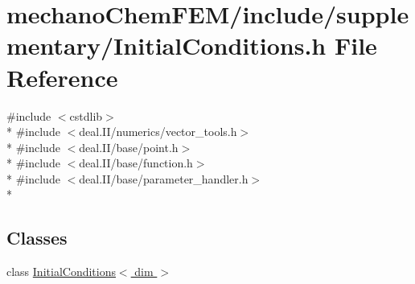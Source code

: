 \section{mechano\-Chem\-F\-E\-M/include/supplementary/\-Initial\-Conditions.h File Reference}
\label{_initial_conditions_8h}
{\ttfamily \#include $<$cstdlib$>$}\\*
{\ttfamily \#include $<$deal.\-I\-I/numerics/vector\-\_\-tools.\-h$>$}\\*
{\ttfamily \#include $<$deal.\-I\-I/base/point.\-h$>$}\\*
{\ttfamily \#include $<$deal.\-I\-I/base/function.\-h$>$}\\*
{\ttfamily \#include $<$deal.\-I\-I/base/parameter\-\_\-handler.\-h$>$}\\*
\subsection*{Classes}
\begin{DoxyCompactItemize}
\item 
class \hyperlink{class_initial_conditions}{Initial\-Conditions$<$ dim $>$}
\end{DoxyCompactItemize}
